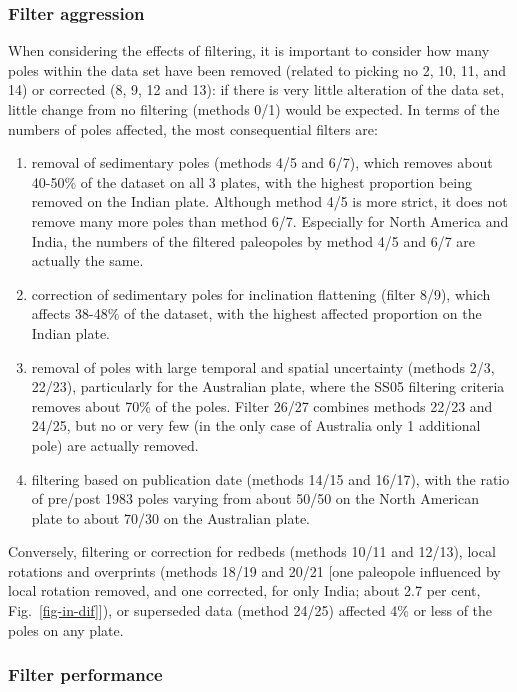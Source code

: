 \subsubsection{Filter aggression}

When considering the effects of filtering, it is important to consider how many
poles within the data set have been removed (related to picking no
2, 10, 11, and 14) or corrected (8, 9, 12 and 13): if
there is very little alteration of the data set, little change from no filtering
(methods 0/1) would be expected. In terms of the numbers of poles affected, the
most consequential filters are:
%
\begin{enumerate}
  \item removal of sedimentary poles (methods 4/5 and 6/7), which removes about
        40-50\% of the dataset on all 3 plates, with the highest proportion
		being removed on the Indian plate. Although method 4/5 is more strict,
		it does not remove many more poles than method 6/7. Especially for North
		America and India, the numbers of the filtered paleopoles by method 4/5
		and 6/7 are actually the same.
  \item correction of sedimentary poles for inclination flattening (filter
		8/9), which affects 38-48\% of the dataset, with the highest affected
		proportion on the Indian plate.
  \item removal of poles with large temporal and spatial uncertainty (methods
		2/3, 22/23), particularly for the Australian plate, where the SS05
		filtering criteria removes about 70\% of the poles. Filter 26/27
		combines methods 22/23 and 24/25, but no or very few (in the only case
		of Australia only 1 additional pole) are actually removed.
  \item filtering based on publication date (methods 14/15 and 16/17), with the
		ratio of pre/post 1983 poles varying from about 50/50 on the North
		American plate to about 70/30 on the Australian plate.
\end{enumerate}

Conversely, filtering or correction for redbeds (methods 10/11 and 12/13), local
rotations and overprints (methods 18/19 and 20/21 [one paleopole influenced by
local rotation removed, and one corrected, for only India; about 2.7 per cent,
Fig.~\ref{fig-in-dif}]), or superseded data (method 24/25) affected 4\% or less
of the poles on any plate.

\subsubsection{Filter performance}


